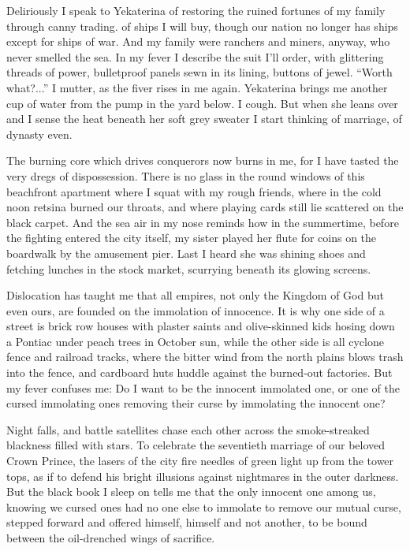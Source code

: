 \documentclass[english,11pt,letterpaper,onecolumn,parskip=full]{scrbook}
\begin{document}
	Deliriously I speak to Yekaterina of restoring the ruined fortunes of my family through canny trading. of ships I will buy, though our nation no longer has ships except for ships of war.  And my family were ranchers and miners, anyway, who never smelled the sea.  In my fever I describe the suit I'll order, with glittering threads of power, bulletproof panels sewn in its lining, buttons of jewel.  ``Worth what?...'' I mutter, as the fiver rises in me again.  Yekaterina brings me another cup of water from the pump in the yard below.  I cough.  But when she leans over and I sense the heat beneath her soft grey sweater I start thinking of marriage, of dynasty even.

	The burning core which drives conquerors now burns in me, for I have tasted the very dregs of dispossession.  There is no glass in the round windows of this beachfront apartment where I squat with my rough friends, where in the cold noon retsina burned our throats, and where playing cards still lie scattered on the black carpet.  And the sea air in my nose reminds how in the summertime, before the fighting entered the city itself, my sister played her flute for coins on the boardwalk by the amusement pier.  Last I heard she was shining shoes and fetching lunches in the stock market, scurrying beneath its glowing screens.

	Dislocation has taught me that all empires, not only the Kingdom of God but even ours, are founded on the immolation of innocence.  It is why one side of a street is brick row houses with plaster saints and olive-skinned kids hosing down a Pontiac under peach trees in October sun, while the other side is all cyclone fence and railroad tracks, where the bitter wind from the north plains blows trash into the fence, and cardboard huts huddle against the burned-out factories.  But my fever confuses me:  Do I want to be the innocent immolated one, or one of the cursed immolating ones removing their curse by immolating the innocent one?

	Night falls, and battle satellites chase each other across the smoke-streaked blackness filled with stars.  To celebrate the seventieth marriage of our beloved Crown Prince, the lasers of the city fire needles of green light up from the tower tops, as if to defend his bright illusions against nightmares in the outer darkness.  But the black book I sleep on tells me that the only innocent one among us, knowing we cursed ones had no one else to immolate to remove our mutual curse, stepped forward and offered himself, himself and not another, to be bound between the oil-drenched wings of sacrifice.
\end{document}
